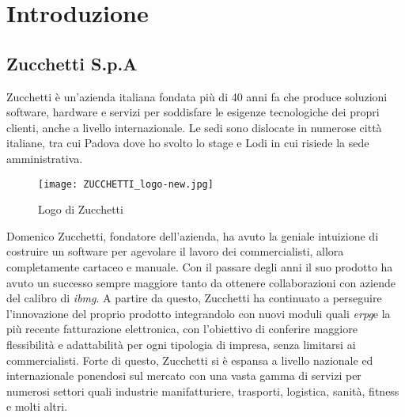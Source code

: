 
\chapter{Introduzione}
\label{cap:introduzione}





\section{Zucchetti S.p.A}
Zucchetti è un'azienda italiana fondata più di 40 anni fa che produce soluzioni software, hardware e servizi per soddisfare le esigenze tecnologiche dei propri clienti, anche a livello internazionale. Le sedi sono dislocate in numerose città italiane, tra cui Padova dove ho svolto lo stage e Lodi in cui risiede la sede amministrativa.

\begin{figure}[htbp]
	\begin{center}
		\texttt{[image: ZUCCHETTI\_logo-new.jpg]}
		\caption{Logo di Zucchetti}
	\end{center}
\end{figure}

Domenico Zucchetti, fondatore dell'azienda, ha avuto la geniale intuizione di costruire un software per agevolare il lavoro dei commercialisti, allora completamente cartaceo e manuale. Con il passare degli anni il suo prodotto ha avuto un successo sempre maggiore tanto da ottenere collaborazioni con aziende del calibro di \emph{\gls{ibmg}}\glsfirstoccur. A partire da questo, Zucchetti ha continuato a perseguire l'innovazione del proprio prodotto integrandolo con nuovi moduli quali \emph{\gls{erpg}}\glsfirstoccur e la più recente fatturazione elettronica, con l'obiettivo di conferire maggiore flessibilità e adattabilità per ogni tipologia di impresa, senza limitarsi ai commercialisti. Forte di questo, Zucchetti si è espansa a livello nazionale ed internazionale ponendosi sul mercato con una vasta gamma di servizi per numerosi settori quali industrie manifatturiere, trasporti, logistica, sanità, fitness e molti altri. \\

